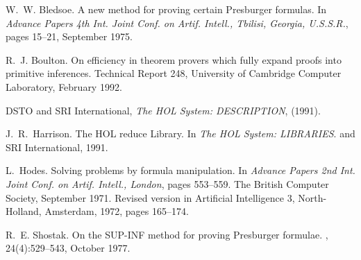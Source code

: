 \begin{thebibliography}{99}

W.~W. Bledsoe.
\newblock A new method for proving certain {P}resburger formulas.
\newblock In {\em Advance Papers 4th Int. Joint Conf. on Artif. Intell.,
  Tbilisi, Georgia, U.S.S.R.}, pages 15--21, September 1975.

R.~J. Boulton.
\newblock On efficiency in theorem provers which fully expand proofs into
  primitive inferences.
\newblock Technical Report 248, University of Cambridge Computer Laboratory,
  February 1992.

{\small DSTO} and {\small SRI} International, 
{\em The HOL System: DESCRIPTION}, (1991).

J.~R.~Harrison.
\newblock The HOL reduce Library.
\newblock In {\em The HOL System: LIBRARIES}.
 and {\small SRI} International, 1991.

L.~Hodes.
\newblock Solving problems by formula manipulation.
\newblock In {\em Advance Papers 2nd Int. Joint Conf. on Artif. Intell.,
  London}, pages 553--559. The British Computer Society, September 1971.
\newblock Revised version in Artificial Intelligence 3, North-Holland,
  Amsterdam, 1972, pages 165--174.

R.~E. Shostak.
\newblock On the {SUP-INF} method for proving {P}resburger formulae.
, 24(4):529--543, October 1977.

\end{thebibliography}


